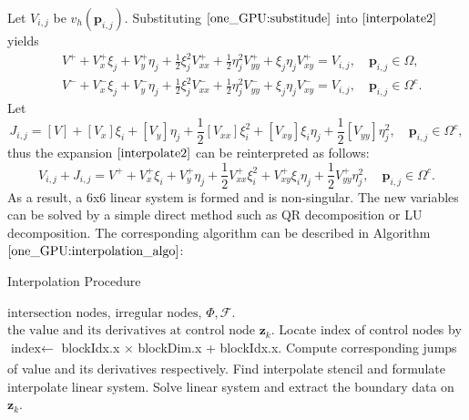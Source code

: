 Let $V_{i,j}$ be $v_h({\mathbf{p}_{i,j}})$. Substituting $\eqref{one_GPU:substitude}$ into $\eqref{interpolate2}$ yields
\begin{equation}
\begin{aligned}
    & V^{+}+V_x^{+} \xi_j+V_y^{+} \eta_j+\frac{1}{2} \xi_j^2 V_{x x}^{+}+\frac{1}{2} \eta_j^2 V_{y y}^{+}+\xi_j \eta_j V_{x y}^{+}=V_{i,j}, \quad \mathbf{p}_{i,j} \in \Omega, \\
    & V^{-}+V_x^{-} \xi_j+V_y^{-} \eta_j+\frac{1}{2} \xi_j^2 V_{x x}^{-}+\frac{1}{2} \eta_j^2 V_{y y}^{-}+\xi_j \eta_j V_{x y}^{-}=V_{i,j}, 
    \quad \mathbf{p}_{i,j} \in \Omega^{c}.
\end{aligned}\label{one_GPU:substep}
\end{equation}
Let 
\begin{equation}
    J_{i,j} = [V] + [V_{x}]\xi_{i} + [V_{y}]\eta_{j} + \frac{1}{2}[V_{x x}]\xi_{i}^{2} + [V_{x y}] \xi_{i} \eta_{j} + \frac{1}{2}[V_{y y}]\eta_{j}^{2}, \quad \mathbf{p}_{i,j} \in \Omega^{c},
\end{equation}
thus the expansion $\eqref{interpolate2}$ can be reinterpreted as follows:
\begin{equation}
    V_{i,j}+ J_{i,j} =  V^{+} + V_{x}^{+}\xi_{i} + V_{y}^{+}\eta_{j}+ \frac{1}{2}V^{+}_{x x}\xi_{i}^{2} + 
    V_{x y}^{+}\xi_{i}\eta_{j} + \frac{1}{2}V^{+}_{y y}\eta_{j}^{2}, \quad \mathbf{p}_{i,j} \in \Omega^{c}.
\end{equation}
As a result, a 6x6 linear system is formed and is non-singular. The new variables can be solved by a simple direct method such as QR decomposition or LU decomposition. 
The corresponding algorithm can be described in Algorithm $\ref{one_GPU:interpolation_algo}$:
\fi
\begin{algorithm}
\renewcommand{\algorithmicrequire}{\textbf{Input:}}
\renewcommand{\algorithmicensure}{\textbf{Output:}}
\caption{Interpolation Procedure}
\begin{algorithmic}[1]
\Require $\text{intersection nodes, irregular nodes, } \Phi, \mathcal{F}$.
\Ensure $\text{the value and its derivatives at control node $\mathbf{z}_{k}$}$.
\State Locate index of control nodes by $\text{index} \xleftarrow[]{}$ blockIdx.x $\times$ blockDim.x + blockIdx.x.
    \State Compute corresponding jumps of value and its derivatives respectively.
    \State Find interpolate stencil and formulate interpolate linear system.
    \State Solve linear system and extract the boundary data on $\mathbf{z}_{k}$.
\EndFor 
\end{algorithmic}\label{one_GPU:interpolation_algo}
\end{algorithm}

